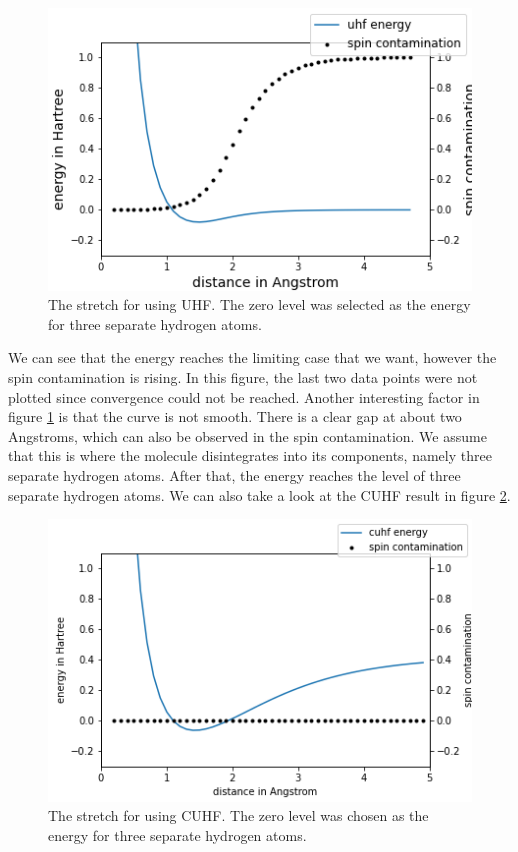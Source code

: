 \documentclass[twoside,twocolumn,9pt]{article}
\begin{document}
\begin{center}
  \begin{figure}[h]
    \includegraphics[width=\linewidth]{./../notes/figures/h3_uhf_sto-3g.png}
    \caption{The stretch for  using UHF. The zero level was selected as the energy for three separate hydrogen atoms.}
    \label{fig:uhf_h3}
  \end{figure}
\end{center}

We can see that the energy reaches the limiting case that we want, however the spin contamination is rising. In this figure, the last two data points were not plotted since convergence
could not be reached. Another interesting factor in figure \ref{fig:uhf_h3} is that the curve
is not smooth. There is a clear gap at about two Angstroms, which can also be observed in the spin contamination. We assume that this is where the molecule disintegrates
into its components, namely three separate hydrogen atoms. After that, the energy reaches the level of three separate hydrogen atoms. We can also take a look at the CUHF result in
figure \ref{fig:cuhf_h3}.
\begin{center}
  \begin{figure}[h]
    \includegraphics[width=\linewidth]{./../notes/figures/h3_cuhf.png}
    \caption{The stretch for  using CUHF. The zero level was chosen as the energy for three separate hydrogen atoms.}
    \label{fig:cuhf_h3}
  \end{figure}
\end{center}
\end{document}
